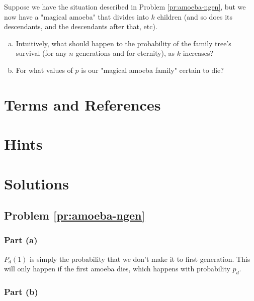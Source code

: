 \begin{problem}
\label{pr:amoeba-kdesc}
Suppose we have the situation described in Problem \ref{pr:amoeba-ngen}, but we now have a "magical amoeba" that divides into $k$ children (and so does its descendants, and the descendants after that, etc). 

\begin{enumerate}[(a)]
\item Intuitively, what should happen to the probability of the family tree's survival (for any $n$ generations and for eternity), as $k$ increases?
\item For what values of $p$ is our "magical amoeba family" certain to die?
\end{enumerate}
\end{problem}


\newpage
\section{Terms and References}

\section{Hints}

\newpage
\section{Solutions}

\subsection{Problem \ref{pr:amoeba-ngen}}

\subsubsection{Part (a)}

$P_d(1)$ is simply the probability that we don't make it to first generation. This will only happen if the first amoeba dies, which happens with probability $p_d$.



\subsubsection{Part (b)}

